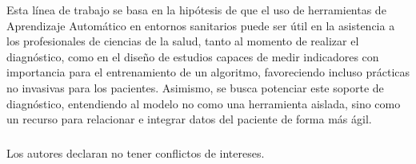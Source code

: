 \documentclass{llncs}
\begin{document}
Esta línea de trabajo se basa en la hipótesis de que el uso de herramientas de Aprendizaje Automático en entornos sanitarios puede ser útil en la asistencia a los profesionales de ciencias de la salud, tanto al momento de realizar el diagnóstico, como en el diseño de estudios capaces de medir indicadores con importancia para el entrenamiento de un algoritmo, favoreciendo incluso prácticas no invasivas para los pacientes.
Asimismo, se busca potenciar este soporte de diagnóstico, entendiendo al modelo no como una herramienta aislada, sino como un recurso para relacionar e integrar datos del paciente de forma más ágil. 

\begin{credits}

\subsubsection{\discintname}
Los autores declaran no tener conflictos de intereses.
\end{credits}
%
%

\printbibliography[title={Referencias}]
\end{document}
